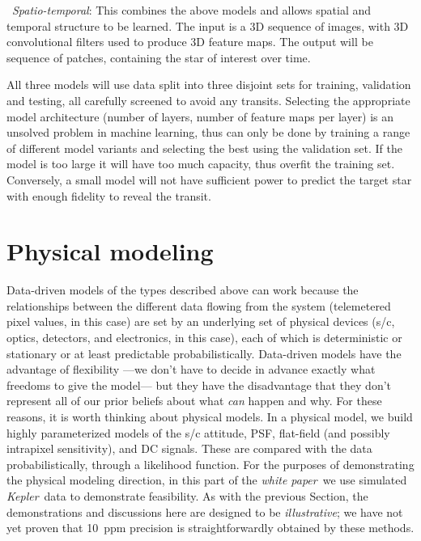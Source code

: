 \documentclass[letterpaper,12pt,whitepaper]{haastex}
\newcommand{\sectionname}{Section}
\newcommand{\documentname}{\textsl{white paper}}
\newcommand{\observatory}[1]{\textsl{#1}}
\newcommand{\Kepler}{\observatory{Kepler}}
\newcounter{inlineitem}
\newcommand{\inlineitem}{\refstepcounter{inlineitem}{\textsl{(\theinlineitem)}}}
\begin{document}
\inlineitem~\emph{Spatio-temporal}: This combines the above models and allows spatial
and temporal structure to be learned. The input is a 3D sequence of
images, with 3D convolutional filters used to produce 3D feature maps.
The output will be sequence of patches, containing the star of
interest over time.

All three models will use data split into three disjoint sets for
training, validation and testing, all carefully screened to avoid any
transits. Selecting the appropriate model architecture (number of
layers, number of feature maps per layer) is an unsolved problem in
machine learning, thus can only be done by training a range of
different model variants and selecting the best using the validation
set. If the model is too large it will have too much capacity, thus
overfit the training set. Conversely, a small model will not have
sufficient power to predict the target star with enough fidelity to
reveal the transit.

\section{Physical modeling}\label{sec:physical}

Data-driven models of the types described above can work
  because the relationships between the different data flowing from the system
  (telemetered pixel values, in this case)
  are set by an underlying set of physical devices
  (s/c, optics, detectors, and electronics, in this case),
  each of which is deterministic or stationary or at least predictable probabilistically.
Data-driven models have the advantage of flexibility%
  ---we don't have to decide in advance exactly what freedoms to give the model---%
  but they have the disadvantage that they don't represent all of our prior beliefs
  about what \emph{can} happen and why.
For these reasons, it is worth thinking about physical models.
In a physical model, we build highly parameterized models
  of the s/c attitude, PSF, flat-field (and possibly intrapixel sensitivity),
  and DC signals.
These are compared with the data probabilistically,
  through a likelihood function.
For the purposes of demonstrating the physical modeling direction,
  in this part of the \documentname\ we use simulated \Kepler\ data
  to demonstrate feasibility.
As with the previous \sectionname, the demonstrations and discussions here are designed
  to be \emph{illustrative};
  we have not yet proven that 10~ppm precision is straightforwardly obtained by these methods.
\end{document}
